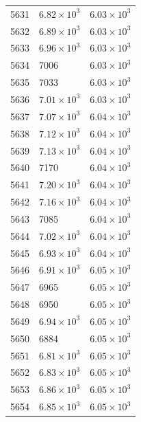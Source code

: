 \begin{table}[H]
\begin{tabular}{lll}
5631 & $\displaystyle 6.82 \times 10^{3}$ & $\displaystyle 6.03 \times 10^{3}$ \\
5632 & $\displaystyle 6.89 \times 10^{3}$ & $\displaystyle 6.03 \times 10^{3}$ \\
5633 & $\displaystyle 6.96 \times 10^{3}$ & $\displaystyle 6.03 \times 10^{3}$ \\
5634 & 7006 & $\displaystyle 6.03 \times 10^{3}$ \\
5635 & 7033 & $\displaystyle 6.03 \times 10^{3}$ \\
5636 & $\displaystyle 7.01 \times 10^{3}$ & $\displaystyle 6.03 \times 10^{3}$ \\
5637 & $\displaystyle 7.07 \times 10^{3}$ & $\displaystyle 6.04 \times 10^{3}$ \\
5638 & $\displaystyle 7.12 \times 10^{3}$ & $\displaystyle 6.04 \times 10^{3}$ \\
5639 & $\displaystyle 7.13 \times 10^{3}$ & $\displaystyle 6.04 \times 10^{3}$ \\
5640 & 7170 & $\displaystyle 6.04 \times 10^{3}$ \\
5641 & $\displaystyle 7.20 \times 10^{3}$ & $\displaystyle 6.04 \times 10^{3}$ \\
5642 & $\displaystyle 7.16 \times 10^{3}$ & $\displaystyle 6.04 \times 10^{3}$ \\
5643 & 7085 & $\displaystyle 6.04 \times 10^{3}$ \\
5644 & $\displaystyle 7.02 \times 10^{3}$ & $\displaystyle 6.04 \times 10^{3}$ \\
5645 & $\displaystyle 6.93 \times 10^{3}$ & $\displaystyle 6.04 \times 10^{3}$ \\
5646 & $\displaystyle 6.91 \times 10^{3}$ & $\displaystyle 6.05 \times 10^{3}$ \\
5647 & 6965 & $\displaystyle 6.05 \times 10^{3}$ \\
5648 & 6950 & $\displaystyle 6.05 \times 10^{3}$ \\
5649 & $\displaystyle 6.94 \times 10^{3}$ & $\displaystyle 6.05 \times 10^{3}$ \\
5650 & 6884 & $\displaystyle 6.05 \times 10^{3}$ \\
5651 & $\displaystyle 6.81 \times 10^{3}$ & $\displaystyle 6.05 \times 10^{3}$ \\
5652 & $\displaystyle 6.83 \times 10^{3}$ & $\displaystyle 6.05 \times 10^{3}$ \\
5653 & $\displaystyle 6.86 \times 10^{3}$ & $\displaystyle 6.05 \times 10^{3}$ \\
5654 & $\displaystyle 6.85 \times 10^{3}$ & $\displaystyle 6.05 \times 10^{3}$ \\

\end{tabular}
\end{table}
